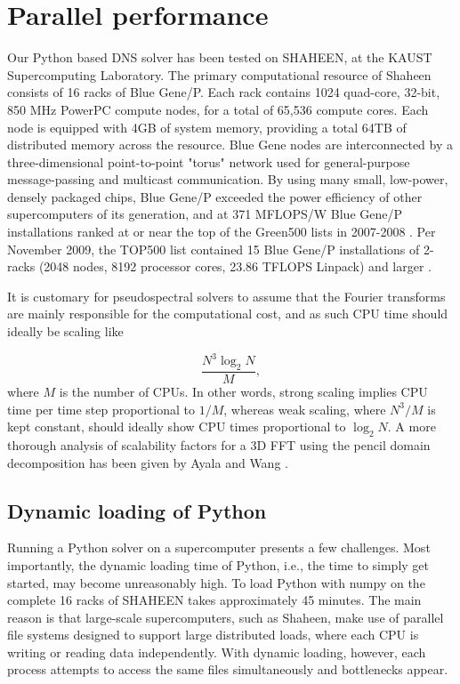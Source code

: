 \documentclass[11pt, oneside]{article}
\begin{document}
\section{Parallel performance}
Our Python based DNS solver has been tested on SHAHEEN, at the KAUST Supercomputing Laboratory. The primary computational resource of Shaheen consists of 16 racks of Blue Gene/P. Each rack contains 1024 quad-core, 32-bit, 850 MHz PowerPC compute nodes, for a total of 65,536 compute cores. Each node is equipped with 4GB of system memory, providing a total 64TB of distributed memory across the resource. Blue Gene nodes are interconnected by a three-dimensional point-to-point "torus" network used for general-purpose message-passing and multicast communication. By using many small, low-power, densely packaged chips, Blue Gene/P exceeded the power efficiency of other supercomputers of its generation, and at 371 MFLOPS/W Blue Gene/P installations ranked at or near the top of the Green500 lists in 2007-2008 \cite{top500green}.  Per November 2009, the TOP500 list contained 15 Blue Gene/P installations of 2-racks (2048 nodes, 8192 processor cores, 23.86 TFLOPS Linpack) and larger \cite{top500}.

It is customary for pseudospectral solvers to assume that the Fourier transforms are mainly responsible for the computational cost, and as such CPU time should ideally be scaling like

\begin{equation}
 \frac{N^3 \log_2 N}{M},
\end{equation}
where $M$ is the number of CPUs. In other words, strong scaling implies CPU time per time step proportional to $1/M$, whereas weak scaling, where $N^3/M$ is kept constant, should ideally show CPU times proportional to $\log_2 N$. A more thorough analysis of scalability factors for a 3D FFT using the pencil domain decomposition has been given by Ayala and Wang \cite{ayala2013}.

\subsection{Dynamic loading of Python}
Running a Python solver on a supercomputer presents a few challenges. Most importantly, the dynamic loading time of Python, i.e., the time to simply get started, may become unreasonably high. To load Python with numpy on the complete 16 racks of SHAHEEN takes approximately 45 minutes. The main reason is that large-scale supercomputers, such as Shaheen, make use of parallel file systems designed to support large distributed loads, where each CPU is writing or reading data independently. With dynamic loading, however, each process attempts to access the same files simultaneously and bottlenecks appear. 
\end{document}

